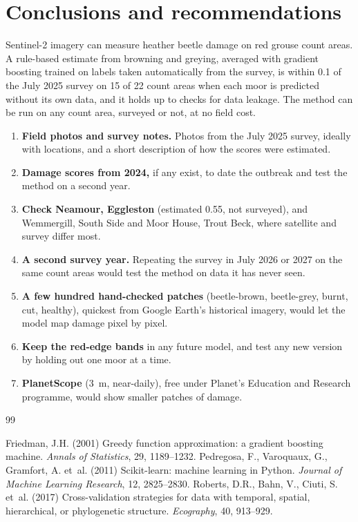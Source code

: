 \documentclass[11pt,a4paper]{article}
\begin{document}
\section{Conclusions and recommendations}\label{sec:conclusions}

Sentinel-2 imagery can measure heather beetle damage on red grouse count areas. A rule-based estimate from browning and greying, averaged with gradient boosting trained on labels taken automatically from the survey, is within 0.1 of the July 2025 survey on 15 of 22 count areas when each moor is predicted without its own data, and it holds up to checks for data leakage. The method can be run on any count area, surveyed or not, at no field cost.

\begin{enumerate}
\item \textbf{Field photos and survey notes.} Photos from the July 2025 survey, ideally with locations, and a short description of how the scores were estimated.
\item \textbf{Damage scores from 2024,} if any exist, to date the outbreak and test the method on a second year.
\item \textbf{Check Neamour, Eggleston} (estimated 0.55, not surveyed), and Wemmergill, South Side and Moor House, Trout Beck, where satellite and survey differ most.
\item \textbf{A second survey year.} Repeating the survey in July 2026 or 2027 on the same count areas would test the method on data it has never seen.
\item \textbf{A few hundred hand-checked patches} (beetle-brown, beetle-grey, burnt, cut, healthy), quickest from Google Earth's historical imagery, would let the model map damage pixel by pixel.
\item \textbf{Keep the red-edge bands} in any future model, and test any new version by holding out one moor at a time.
\item \textbf{PlanetScope} (3~m, near-daily), free under Planet's Education and Research programme, would show smaller patches of damage.
\end{enumerate}

\begin{thebibliography}{99}
 Friedman, J.H. (2001) Greedy function approximation: a gradient boosting machine. \emph{Annals of Statistics}, 29, 1189--1232.
 Pedregosa, F., Varoquaux, G., Gramfort, A. et~al. (2011) Scikit-learn: machine learning in Python. \emph{Journal of Machine Learning Research}, 12, 2825--2830.
 Roberts, D.R., Bahn, V., Ciuti, S. et~al. (2017) Cross-validation strategies for data with temporal, spatial, hierarchical, or phylogenetic structure. \emph{Ecography}, 40, 913--929.
\end{thebibliography}
\end{document}
